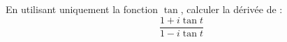 En utilisant uniquement la fonction $\tan$, calculer la d\'eriv\'ee de :
\begin{displaymath}
 \frac{1 + i\tan t}{1 -i\tan t} 
\end{displaymath}
\bigskip \bigskip
